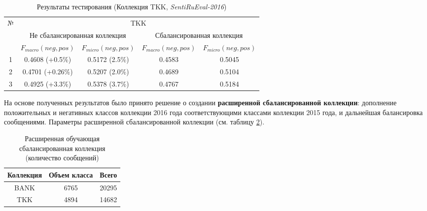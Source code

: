 \begin{table}[ht!]
\centering
\caption{Результаты тестирования (Коллекция TKK, {\it SentiRuEval-2016})}
\label{table:tkkResult2015}
\begin{tabular}{|c|c|c|c|c|}
\hline
\multirow{3}{*}{№} & \multicolumn{4}{c|}{TKK}                                                                             \\ \cline{2-5}
                   & \multicolumn{2}{c|}{Не сбалансированная коллекция} & \multicolumn{2}{c|}{Сбалансированная коллекция} \\ \cline{2-5}
                   & $F_{macro}(neg, pos)$    & $F_{micro}(neg, pos)$   & $F_{macro}(neg, pos)$  & $F_{micro}(neg, pos)$  \\ \hline
1                  & 0.4608 (+0.5\%)          & 0.5172 (2.5\%)          & 0.4583                 & 0.5045                 \\ \hline
2                  & 0.4701 (+0.26\%)         & 0.5207 (2.0\%)          & 0.4689                 & 0.5104                 \\ \hline
3                  & 0.4925 (+3.3\%)        & 0.5378 (3.7\%)          & 0.4767                 & 0.5184                 \\ \hline
\end{tabular}
\end{table}

%
%
На основе полученных результатов было принято решение о создании {\bf расширенной
сбалансированной коллекции}: дополнение положительных и негативных классов
коллекции 2016 года соответствующими классами коллекции 2015 года, и дальнейшая
балансировка сообщениями.
Параметры расширенной сбалансированной коллекции (см. таблицу
\ref{table:extendedCollection}).

\begin{table}[ht!]
\centering
\caption{Расширенная обучающая сбалансированная коллекция (количество сообщений)}
\label{table:extendedCollection}
\begin{tabular}{|c|c|c|}
\hline
Коллекция & Объем класса & Всего \\ \hline
BANK      & 6765         & 20295 \\ \hline
TKK       & 4894         & 14682 \\ \hline
\end{tabular}
\end{table}
